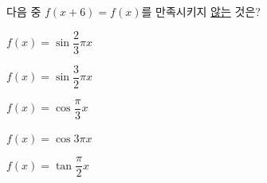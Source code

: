 다음 중 $f(x+6)=f(x)$를 만족시키지 \underline{않는} 것은?
\begin{choicesii}{\rule[-3ex]{0pt}{8ex}$f(x)=\sin\dfrac{2}{3}\pi x$}{\rule[-3ex]{0pt}{8ex}$f(x)=\sin\dfrac{3}{2}\pi x$}{\rule[-3ex]{0pt}{8ex}$f(x)=\cos\dfrac{\pi}{3}x$}{\rule[-3ex]{0pt}{8ex}$f(x)=\cos 3\pi x$}{\rule[-3ex]{0pt}{8ex}$f(x)=\tan\dfrac{\pi}{2}x$}\end{choicesii}
